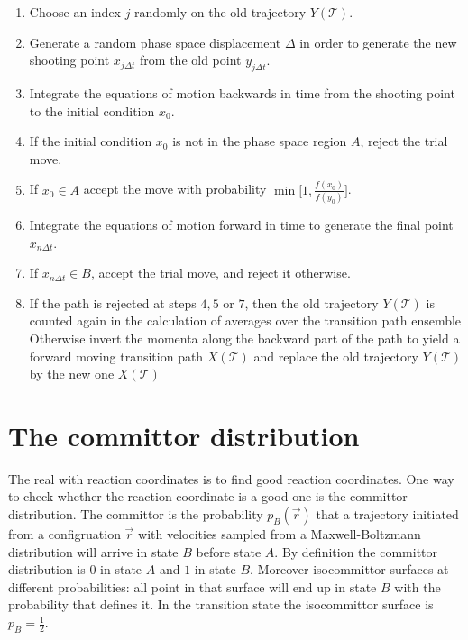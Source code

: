 	\begin{enumerate}
		\item Choose an index $j$ randomly on the old trajectory $Y(\mathcal{T})$.
		\item Generate a random phase space displacement $\Delta$ in order to generate the new shooting point $x_{j\Delta t}$ from the old point $y_{j\Delta t}$.
		\item Integrate the equations of motion backwards in time from the shooting point to the initial condition $x_0$.
		\item If the initial condition $x_0$ is not in the phase space region $A$, reject the trial move.
		\item If $x_0\in A$ accept the move with probability $\min\biggl[1,\frac{f(x_0)}{f(y_0)}\biggr]$.
		\item Integrate the equations of motion forward in time to generate the final point $x_{n\Delta t}$.
		\item If $x_{n\Delta t}\in B$, accept the trial move, and reject it otherwise.
		\item If the path is rejected at steps $4, 5$ or $7$, then the old trajectory $Y(\mathcal{T})$ is counted again in the calculation of averages over the transition path ensemble
			Otherwise invert the momenta along the backward part of the path to yield a forward moving transition path $X(\mathcal{T})$ and replace the old trajectory $Y(\mathcal{T})$ by the new one $X(\mathcal{T})$
	\end{enumerate}

\section{The committor distribution}
The real with reaction coordinates is to find good reaction coordinates.
One way to check whether the reaction coordinate is a good one is the committor distribution.
The committor is the probability $p_B(\vec{r})$ that a trajectory initiated from a configruation $\vec{r}$ with velocities sampled from a Maxwell-Boltzmann distribution will arrive in state $B$ before state $A$.
By definition the committor distribution is $0$ in state $A$ and $1$ in state $B$.
Moreover isocommittor surfaces at different probabilities: all point in that surface will end up in state $B$ with the probability that defines it.
In the transition state the isocommittor surface is $p_B = \frac{1}{2}$.

